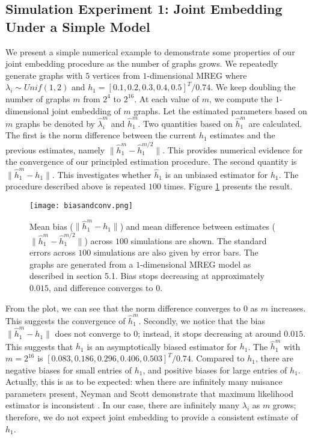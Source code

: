 \documentclass[10pt,journal,compsoc]{IEEEtran}
\begin{document}
\subsection{Simulation Experiment 1: Joint Embedding Under a Simple Model}
\noindent We present a simple numerical example to demonstrate some properties
of our joint embedding procedure as the number of graphs grows. We repeatedly generate graphs with $5$ vertices from $1$-dimensional MREG where $\lambda_i \sim Unif(1,2)$ and $h_1=[0.1,0.2,0.3,0.4,0.5]^T/0.74$. We keep doubling the number of graphs $m$ from $2^4$ to $2^{16}$. At each value of $m$, we compute the $1$-dimensional joint embedding of $m$ graphs. Let the estimated parameters based on $m$ graphs be denoted by $\hat{\lambda}_i^m$ and $\hat{h}_1^m$. Two quantities based on $\hat{h}_1^m$ are calculated. The first is the norm difference between the current $h_1$ estimates and the previous estimates, namely $\|\hat{h}_1^m-\hat{h}_1^{m/2}\|$. This provides numerical evidence for the convergence of our principled estimation procedure. The second quantity is $\|\hat{h}^m_1-h_1\|$. This investigates whether $\hat{h}_1$ is an unbiased estimator for $h_1$. The procedure described above is repeated $100$ times. Figure \ref{fig:db} presents the result. \\

\begin{figure}[!htbp]
	\centering
	\texttt{[image: biasandconv.png]}
	\caption{Mean bias ($\|\hat{h}^m_1-h_1\|$) and mean difference between estimates ($\|\hat{h}_1^m-\hat{h}_1^{m/2}\|$) across $100$ simulations are shown. The standard errors across $100$ simulations are also given by error bars. The graphs are generated from a $1$-dimensional MREG model as described in section 5.1. Bias stops decreasing at approximately $0.015$, and difference converges to $0$.}
	\label{fig:db}
\end{figure}

\noindent From the plot, we can see that the norm difference converges to $0$ as $m$ increases. This suggests the convergence of $\hat{h}_1^m$. Secondly, we notice that the bias $\|\hat{h}^m_1-h_1\|$ does not converge to $0$; instead, it stops decreasing at around $0.015$. This suggests that $\hat{h}_1$ is an asymptotically biased estimator for $h_1$. The $\hat{h}_1^m$ with $m=2^{16}$ is $[0.083,0.186, 0.296, 0.406, 0.503]^T/0.74$. Compared to $h_1$, there are negative biases for small entries of $h_1$, and positive biases for large entries of $h_1$. Actually, this is as to be expected: when there are infinitely many nuisance parameters present, Neyman and Scott demonstrate that maximum likelihood estimator is inconsistent \cite{neyman1948consistent}. In our case, there are infinitely many $\lambda_i$ as $m$ grows; therefore, we do not expect joint embedding to provide a consistent estimate of $h_1$. \\
\end{document}
